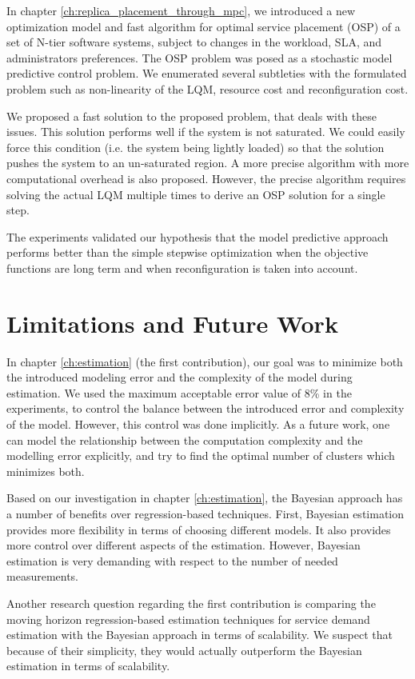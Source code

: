 In  chapter \ref{ch:replica_placement_through_mpc}, we introduced a new optimization model and fast algorithm for optimal service placement (OSP) of a set of N-tier software systems, subject to changes in the workload, SLA, and administrators preferences.
The OSP problem was posed as a stochastic model predictive control problem.
 We enumerated several subtleties with the formulated problem such as non-linearity of the LQM, resource cost and reconfiguration cost.

 We proposed a fast solution to the proposed problem, that deals with these issues.	This solution performs well if the system is not saturated. We could easily force this condition (i.e. the system being lightly loaded) so that the solution pushes the system to an un-saturated region. A more precise algorithm with more computational overhead is also proposed. However, the precise algorithm requires solving the actual LQM multiple times to derive an OSP solution for a single step.  
	
The experiments validated our hypothesis that the model predictive approach performs better than the simple stepwise optimization when the objective functions are long term and when reconfiguration is taken into account.

\section{Limitations and Future Work}
In chapter \ref{ch:estimation} (the first contribution), our goal was to minimize both the introduced modeling error and the complexity of the model during estimation.
We used the maximum acceptable error value of 8\% in the experiments, to control the balance between the introduced error and complexity of the model. 
However, this control was done implicitly.  
As a future work, one can model the relationship between the computation complexity and the modelling error explicitly, and try to find the optimal number of clusters which minimizes both.  

Based on our investigation in chapter \ref{ch:estimation}, the Bayesian approach has a number of benefits over regression-based techniques. First, Bayesian estimation provides more flexibility in terms of choosing different models. It also provides more control over different aspects of the estimation. However, Bayesian estimation is very demanding with respect to the number of needed measurements.

 Another research question regarding the first contribution is comparing the moving horizon regression-based estimation techniques for service demand estimation with the Bayesian approach in terms of scalability. We suspect that because of their simplicity, they would actually outperform the Bayesian estimation in terms of scalability.
 
